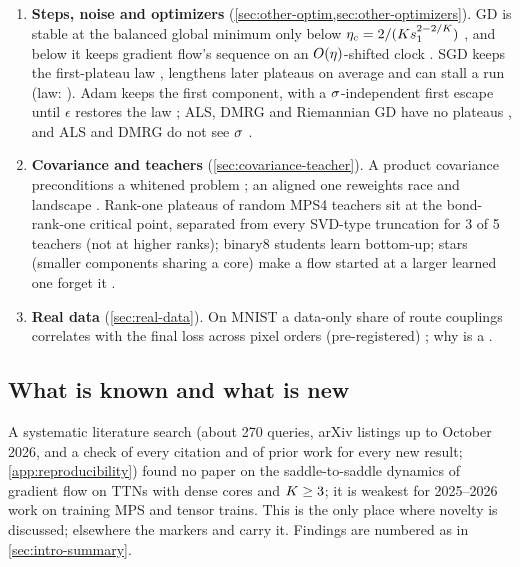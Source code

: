 \begin{enumerate}[label=\arabic*.,ref=\arabic*,leftmargin=*,itemsep=2pt]
{    sec:other-rich,sec:other-large-chi}). With the initial function removed, raising $\isc$ leads from
    saddle-to-saddle through a rich window to lazy training \empirical, which needs full bonds \derived{}
    \empirical; on binary4 both boundaries scale as $\chi^{-1/2}$, the lazy one as predicted \derived{}
    \empirical. The saddle-to-saddle boundary rises with $\Kc$; with the initial function kept and
    spare channels, a limit of $1$ is rejected at $\Kc\le15$ (binary trees, post hoc) \empirical. At large $\chi$ a
    $\mu$P-type parameterization keeps the kernel moving \derived{} \empirical.
  \item\label{it:intro-optim} \textbf{Steps, noise and optimizers}
    (\cref{sec:other-optim,sec:other-optimizers}). GD is stable at the balanced global minimum only below
    $\eta_c=2/(Ks_{1}^{2-2/K})$ \proven, and below it keeps gradient flow's sequence on an $O(\eta)$-shifted
    clock \derived{} \empirical. SGD keeps the first-plateau law \derived, lengthens later plateaus on average
    and can stall a run \empirical{} (law: \conjecture). Adam keeps the first component, with a
    $\isc$-independent first escape until $\epsilon$ restores the law \derived{} \empirical; ALS, DMRG and
    Riemannian GD have no plateaus \derived, and ALS and DMRG do not see $\isc$ \proven.
  \item\label{it:intro-cov} \textbf{Covariance and teachers} (\cref{sec:covariance-teacher}). A
    product covariance preconditions a whitened problem \proven; an aligned one reweights race and
    landscape \derived{} \empirical. Rank-one plateaus of random MPS4 teachers sit at the
    bond-rank-one critical point, separated from every SVD-type truncation for 3 of 5 teachers (not at
    higher ranks); binary8 students learn bottom-up; stars (smaller components sharing a core) make a flow
    started at a larger learned one forget it \empirical.
  \item\label{it:intro-real} \textbf{Real data} (\cref{sec:real-data}). On MNIST a data-only share of
    route couplings correlates with the final loss across pixel orders (pre-registered) \empirical; why is a
    \conjecture.
\end{enumerate}

\subsection{What is known and what is new}\label{sec:intro-prior}
A systematic literature search (about 270 queries, arXiv listings up to October 2026, and a check of
every citation and of prior work for every new result; \cref{app:reproducibility}) found no paper on the
saddle-to-saddle dynamics of gradient flow on TTNs with dense cores and $K\ge3$; it is weakest for
2025--2026 work on training MPS and tensor trains. This is the only place where novelty is discussed;
elsewhere the markers \knownresult{} and \newresult{} carry it. Findings are numbered as in
\cref{sec:intro-summary}.

